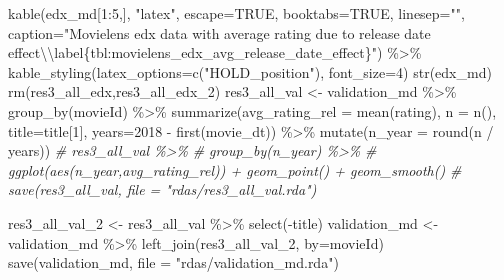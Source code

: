 \documentclass[
]{article}
\newenvironment{Shaded}{}{}
\newcommand{\AttributeTok}[1]{\textcolor[rgb]{0.49,0.56,0.16}{#1}}
\newcommand{\CommentTok}[1]{\textcolor[rgb]{0.38,0.63,0.69}{\textit{#1}}}
\newcommand{\ConstantTok}[1]{\textcolor[rgb]{0.53,0.00,0.00}{#1}}
\newcommand{\DecValTok}[1]{\textcolor[rgb]{0.25,0.63,0.44}{#1}}
\newcommand{\FunctionTok}[1]{\textcolor[rgb]{0.02,0.16,0.49}{#1}}
\newcommand{\NormalTok}[1]{#1}
\newcommand{\OtherTok}[1]{\textcolor[rgb]{0.00,0.44,0.13}{#1}}
\newcommand{\SpecialCharTok}[1]{\textcolor[rgb]{0.25,0.44,0.63}{#1}}
\newcommand{\StringTok}[1]{\textcolor[rgb]{0.25,0.44,0.63}{#1}}
\begin{document}
\begin{Shaded}
\begin{Highlighting}[]
\FunctionTok{kable}\NormalTok{(edx\_md[}\DecValTok{1}\SpecialCharTok{:}\DecValTok{5}\NormalTok{,], }\StringTok{"latex"}\NormalTok{, }\AttributeTok{escape=}\ConstantTok{TRUE}\NormalTok{, }\AttributeTok{booktabs=}\ConstantTok{TRUE}\NormalTok{, }\AttributeTok{linesep=}\StringTok{""}\NormalTok{, }\AttributeTok{caption=}\StringTok{"Movielens edx data with average rating due to release date effect}\SpecialCharTok{\textbackslash{}\textbackslash{}}\StringTok{label\{tbl:movielens\_edx\_avg\_release\_date\_effect\}"}\NormalTok{) }\SpecialCharTok{\%\textgreater{}\%}
    \FunctionTok{kable\_styling}\NormalTok{(}\AttributeTok{latex\_options=}\FunctionTok{c}\NormalTok{(}\StringTok{"HOLD\_position"}\NormalTok{), }\AttributeTok{font\_size=}\DecValTok{4}\NormalTok{)}
\FunctionTok{str}\NormalTok{(edx\_md)}
\FunctionTok{rm}\NormalTok{(res3\_all\_edx,res3\_all\_edx\_2)}
\NormalTok{res3\_all\_val }\OtherTok{\textless{}{-}}\NormalTok{ validation\_md }\SpecialCharTok{\%\textgreater{}\%}
  \FunctionTok{group\_by}\NormalTok{(movieId) }\SpecialCharTok{\%\textgreater{}\%}
  \FunctionTok{summarize}\NormalTok{(}\AttributeTok{avg\_rating\_rel =} \FunctionTok{mean}\NormalTok{(rating), }\AttributeTok{n =} \FunctionTok{n}\NormalTok{(), }\AttributeTok{title=}\NormalTok{title[}\DecValTok{1}\NormalTok{], }\AttributeTok{years=}\DecValTok{2018} \SpecialCharTok{{-}} \FunctionTok{first}\NormalTok{(movie\_dt)) }\SpecialCharTok{\%\textgreater{}\%}
  \FunctionTok{mutate}\NormalTok{(}\AttributeTok{n\_year =} \FunctionTok{round}\NormalTok{(n }\SpecialCharTok{/}\NormalTok{ years))}
\CommentTok{\# res3\_all\_val \%\textgreater{}\% }
\CommentTok{\#   group\_by(n\_year) \%\textgreater{}\% }
\CommentTok{\#   ggplot(aes(n\_year,avg\_rating\_rel)) + geom\_point() + geom\_smooth()}
\CommentTok{\# save(res3\_all\_val, file = "rdas/res3\_all\_val.rda")}

\NormalTok{res3\_all\_val\_2 }\OtherTok{\textless{}{-}}\NormalTok{ res3\_all\_val }\SpecialCharTok{\%\textgreater{}\%} \FunctionTok{select}\NormalTok{(}\SpecialCharTok{{-}}\NormalTok{title)}
\NormalTok{validation\_md }\OtherTok{\textless{}{-}}\NormalTok{ validation\_md }\SpecialCharTok{\%\textgreater{}\%} \FunctionTok{left\_join}\NormalTok{(res3\_all\_val\_2, }\AttributeTok{by=}\StringTok{\textquotesingle{}movieId\textquotesingle{}}\NormalTok{)}
\FunctionTok{save}\NormalTok{(validation\_md, }\AttributeTok{file =} \StringTok{"rdas/validation\_md.rda"}\NormalTok{)}


\end{Highlighting}
\end{Shaded}
\end{document}
